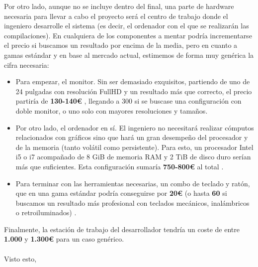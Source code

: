 Por otro lado, aunque no se incluye dentro del final, una parte de hardware necesaria para llevar a cabo el proyecto será el centro de trabajo donde el ingeniero desarrolle el sistema (es decir, el ordenador con el que se realizarán las compilaciones). En cualquiera de los componentes a mentar podría incrementarse el precio si buscamos un resultado por encima de la media, pero en cuanto a gamas estándar y en base al mercado actual, estimemos de forma muy genérica la cifra necesaria:

\begin{itemize}
	\item Para empezar, el monitor. Sin ser demasiado exquisitos, partiendo de uno de 24 pulgadas con resolución FullHD y un resultado más que correcto, el precio partiría de \textbf{130-140€} \cite{monitor-samsung-pccom}, llegando a 300 si se buscase una configuración con doble monitor, o uno solo con mayores resoluciones y tamaños.
	\item Por otro lado, el ordenador en sí. El ingeniero no necesitará realizar cómputos relacionados con gráficos sino que hará un gran desempeño del procesador y de la memoria (tanto volátil como persistente). Para esto, un procesador Intel i5 o i7 acompañado de 8 GiB de memoria RAM y 2 TiB de disco duro serían más que suficientes. Esta configuración sumaría \textbf{750-800€} al total \cite{ordenador-sobremesa-pccom}.
	\item Para terminar con las herramientas necesarias, un combo de teclado y ratón, que en una gama estándar podría conseguirse por \textbf{20€} (o hasta \textbf{60} si buscamos un resultado más profesional con teclados mecánicos, inalámbricos o retroiluminados) \cite{combo-teclado-logitech-pccom}.
\end{itemize}

Finalmente, la estación de trabajo del desarrollador tendría un coste de entre \textbf{1.000} y \textbf{1.300€} para un caso genérico.\\

\noindent\makebox[\linewidth]{\rule{\textwidth}{0.4pt}}\\

Visto esto, 

\newpage